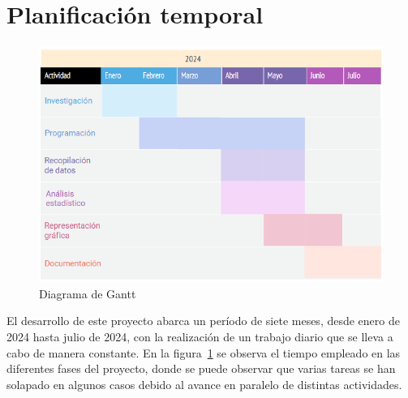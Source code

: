 \documentclass[a4paper, 12pt]{book}
\begin{document}
\section{Planificación temporal}
\label{sec:planificacion-temporal}

\begin{figure}
  \centering
  \includegraphics[width=14cm, keepaspectratio]{img/Diagrama_Gantt.png}
  \caption{Diagrama de Gantt}
  \label{fig:diagrama_gantt}
\end{figure}

El desarrollo de este proyecto abarca un período de siete meses, desde enero de 2024 hasta julio de 2024, con la realización de un trabajo diario que se lleva a cabo
de manera constante. En la figura~\ref{fig:diagrama_gantt} se observa el tiempo empleado en las diferentes fases del proyecto, donde se puede
observar que varias tareas se han solapado en algunos casos debido al avance en paralelo de distintas actividades.
\end{document}
